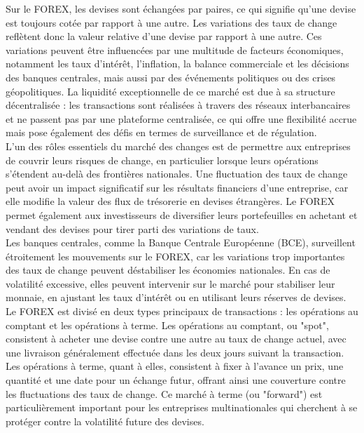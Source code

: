 \begin{sloppypar}
Sur le FOREX, les devises sont échangées par paires, ce qui signifie qu'une devise est toujours cotée par rapport à une autre. Les variations des taux de change reflètent donc la valeur relative d'une devise par rapport à une autre. Ces variations peuvent être influencées par une multitude de facteurs économiques, notamment les taux d'intérêt, l'inflation, la balance commerciale et les décisions des banques centrales, mais aussi par des événements politiques ou des crises géopolitiques. La liquidité exceptionnelle de ce marché est due à sa structure décentralisée : les transactions sont réalisées à travers des réseaux interbancaires et ne passent pas par une plateforme centralisée, ce qui offre une flexibilité accrue mais pose également des défis en termes de surveillance et de régulation.\\

L’un des rôles essentiels du marché des changes est de permettre aux entreprises de couvrir leurs risques de change, en particulier lorsque leurs opérations s’étendent au-delà des frontières nationales. Une fluctuation des taux de change peut avoir un impact significatif sur les résultats financiers d’une entreprise, car elle modifie la valeur des flux de trésorerie en devises étrangères. Le FOREX permet également aux investisseurs de diversifier leurs portefeuilles en achetant et vendant des devises pour tirer parti des variations de taux.\\

Les banques centrales, comme la Banque Centrale Européenne (BCE), surveillent étroitement les mouvements sur le FOREX, car les variations trop importantes des taux de change peuvent déstabiliser les économies nationales. En cas de volatilité excessive, elles peuvent intervenir sur le marché pour stabiliser leur monnaie, en ajustant les taux d’intérêt ou en utilisant leurs réserves de devises. Le FOREX est divisé en deux types principaux de transactions : les opérations au comptant et les opérations à terme. Les opérations au comptant, ou "spot", consistent à acheter une devise contre une autre au taux de change actuel, avec une livraison généralement effectuée dans les deux jours suivant la transaction. Les opérations à terme, quant à elles, consistent à fixer à l'avance un prix, une quantité et une date pour un échange futur, offrant ainsi une couverture contre les fluctuations des taux de change. Ce marché à terme (ou "forward") est particulièrement important pour les entreprises multinationales qui cherchent à se protéger contre la volatilité future des devises.\\


\end{sloppypar}
